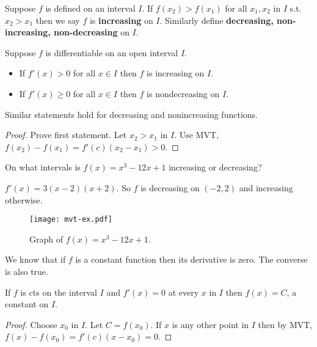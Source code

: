 \documentclass[../main.tex]{subfiles}
\begin{document}
Suppose $f$ is defined on an interval $I$. If $f(x_2) > f(x_1)$ for all $x_1, x_2$ in $I$ s.t. $x_2 > x_1$ then we say $f$ is \textbf{increasing} on $I$. Similarly define \textbf{decreasing, non-increasing, non-decreasing} on $I$.

\begin{theorem}
    Suppose $f$ is differentiable on an open interval $I$.
    \begin{itemize}
        \item If $f'(x)>0$ for all $x \in I$ then $f$ is increasing on $I$.
        \item If $f'(x) \geq 0$ for all $x \in I$ then $f$ is nondecreasing on $I$.
    \end{itemize}
    Similar statements hold for decreasing and nonincreasing functions.
\end{theorem}
\begin{proof}
    Prove first statement. Let $x_2 > x_1$ in $I$. Use MVT, $f(x_2) - f(x_1) = f'(c) (x_2 - x_1) > 0$.
\end{proof}

\begin{example}
    On what intervals is $f(x) = x^3 - 12 x + 1$ increasing or decreasing?
\end{example}
\begin{solution}
    $f'(x) = 3(x-2)(x+2)$. So $f$ is decreasing on $(-2, 2)$ and increasing otherwise.
    \begin{figure}[H]
        \centering
        \texttt{[image: mvt-ex.pdf]}
        \caption{Graph of $f(x) = x^3 - 12 x + 1$.}
    \end{figure}
\end{solution}

We know that if $f$ is a constant function then its derivative is zero. The converse is also true.
\begin{theorem}
    If $f$ is cts on the interval $I$ and $f'(x) = 0$ at every $x$ in $I$ then $f(x) = C$, a constant on $I$.
\end{theorem}
\begin{proof}
    Choose $x_0$ in $I$. Let $C = f(x_0)$. If $x$ is any other point in $I$ then by MVT, $f(x) - f(x_0) = f'(c) (x-x_0) = 0$.
\end{proof}
\end{document}
